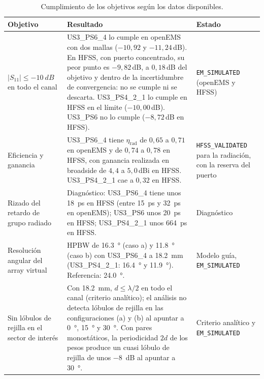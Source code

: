 \documentclass[11pt,a4paper]{article}
\begin{document}
\begin{table}[H]
    \centering
    \caption{Cumplimiento de los objetivos según los datos disponibles.}
    \label{tab:objetivos}
    \begin{tabularx}{\textwidth}{>{\raggedright\arraybackslash}p{} X >{\raggedright\arraybackslash}p{}}
        \toprule
        Objetivo & Resultado & Estado \\
        \midrule
        $|S_{11}| \le \SI{-10}{dB}$ en todo el canal & US3\_PS6\_4 lo cumple en openEMS con dos mallas ($-10{,}92$ y $-11{,}24$\,\si{dB}). En HFSS, con puerto concentrado, su peor punto es $-9{,}82$\,\si{dB}, a $0{,}18$\,\si{dB} del objetivo y dentro de la incertidumbre de convergencia: no se cumple ni se descarta. US3\_PS4\_2\_1 lo cumple en HFSS en el límite ($-10{,}00$\,\si{dB}). US3\_PS6 no lo cumple ($-8{,}72$\,\si{dB} en HFSS). & \texttt{EM\_SIMULATED} (openEMS y HFSS) \\
        Eficiencia y ganancia & US3\_PS6\_4 tiene $\eta_\mathrm{rad}$ de $0{,}65$ a $0{,}71$ en openEMS y de $0{,}74$ a $0{,}78$ en HFSS, con ganancia realizada en broadside de $4{,}4$ a $5{,}0$\,\si{dBi} en HFSS. US3\_PS4\_2\_1 cae a $0{,}32$ en HFSS. & \texttt{HFSS\_VALIDATED} para la radiación, con la reserva del puerto \\
        Rizado del retardo de grupo radiado & Diagnóstico: US3\_PS6\_4 tiene unos \SI{18}{ps} en HFSS (entre \SI{15}{ps} y \SI{32}{ps} en openEMS); US3\_PS6 unos \SI{20}{ps} en HFSS; US3\_PS4\_2\_1 unos \SI{664}{ps} en HFSS. & Diagnóstico \\
        Resolución angular del array virtual & HPBW de \SI{16.3}{\degree} (caso a) y \SI{11.8}{\degree} (caso b) con US3\_PS6\_4 a \SI{18.2}{mm} (US3\_PS4\_2\_1: \SI{16.4}{\degree} y \SI{11.9}{\degree}). Referencia: \SI{24.0}{\degree}. & Modelo guía, \texttt{EM\_SIMULATED} \\
        Sin lóbulos de rejilla en el sector de interés & Con \SI{18.2}{mm}, $d \le \lambda/2$ en todo el canal (criterio analítico); el análisis no detecta lóbulos de rejilla en las configuraciones (a) y (b) al apuntar a \SI{0}{\degree}, \SI{15}{\degree} y \SI{30}{\degree}. Con pares monostáticos, la periodicidad $2d$ de los pesos produce un cuasi lóbulo de rejilla de unos \SI{-8}{dB} al apuntar a \SI{30}{\degree}. & Criterio analítico y \texttt{EM\_SIMULATED} \\
        \bottomrule
    \end{tabularx}
\end{table}
\end{document}
